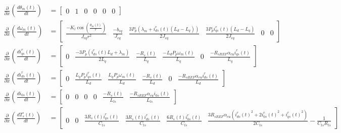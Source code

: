 \documentclass[a4paper, 10pt, onecolumn,journal]{ieeeconf}
\begin{document}
\begin{equation}
    \begin{aligned}
        \frac{\partial}{\partial x}\left( \frac{d \theta_m(t)}{dt}\right) &= \begin{bmatrix} 0 & 1 & 0 & 0 & 0 & 0 \end{bmatrix}\\
        \frac{\partial}{\partial x}\left( \frac{d \omega_m(t)}{dt}\right) &= \begin{bmatrix}
        \frac{-K_{l} \cos\left(\frac{\theta_m(t)}{r}\right)}{J_{eq} r^2} & \frac{-b_{eq}}{J_{eq}} & \frac{3 P_p \left(\lambda_m+i^r_{ds}(t) \left(L_d-L_q\right)\right)}{2 J_{eq}} & \frac{3 P_p i^r_{qs}(t) \left(L_d-L_q\right)}{2 J_{eq}} & 0 & 0 
        \end{bmatrix}\\
        \frac{\partial}{\partial x}\left( \frac{d i^r_{qs}(t)}{dt}\right) &= \begin{bmatrix} 
        0 & \frac{-3 P_p \left(i^r_{ds}(t) L_d+\lambda_m\right)}{2 L_q} & \frac{-R_s(t)}{L_q} & \frac{-L_d P_p \omega_m(t)}{L_q} & 0 & \frac{-R_{sREF} \alpha_{cu} i^r_{qs}(t)}{L_q} 
        \end{bmatrix}\\
        \frac{\partial}{\partial x}\left( \frac{d i^r_{ds}(t)}{dt}\right) &= \begin{bmatrix} 
        0 & \frac{L_q P_p i^r_{qs}(t)}{L_d} & \frac{L_q P_p \omega_m(t)}{L_d} & \frac{-R_s(t)}{L_d} & 0 & \frac{-R_{sREF} \alpha_{cu} i^r_{ds}(t)}{L_d} 
        \end{bmatrix}\\
        \frac{\partial}{\partial x}\left( \frac{d i_{0s}(t)}{dt}\right) &= \begin{bmatrix} 
        0 & 0 & 0 & 0 & \frac{-R_s(t)}{L_{ls}} & \frac{-R_{sREF} \alpha_{cu} i_{0s}(t)}{L_{ls}} 
        \end{bmatrix}\\
        \frac{\partial}{\partial x}\left( \frac{d T^\circ_s(t)}{dt}\right) &= \begin{bmatrix} 
        0 & 0 & \frac{3 R_s(t) i^r_{qs}(t)}{C_{ts}} & \frac{3 R_s(t) i^r_{ds}(t)}{C_{ts}} & \frac{6 R_s(t) i^r_{0s}(t)}{C_{ts}} & \frac{3 R_{sREF} \alpha_{cu} \left({i^r_{ds}(t)}^2+2 {i^r_{0s}(t)}^2+{i^r_{qs}(t)}^2\right)}{2 C_{ts}} - \frac{1}{C_{ts} R_{ts}} 
        \end{bmatrix}\\
    \end{aligned}
    \label{gradientesA}
\end{equation}
\end{document}
